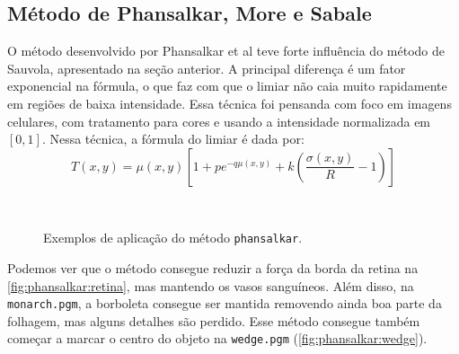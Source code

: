 \subsection{Método de Phansalkar, More e Sabale}

O método desenvolvido por Phansalkar et al teve forte influência do método de Sauvola, apresentado na seção anterior. A principal diferença é um fator exponencial na fórmula, o que faz com que o limiar não caia muito rapidamente em regiões de baixa intensidade. Essa técnica foi pensanda com foco em imagens celulares, com tratamento para cores e usando a intensidade normalizada em $[0, 1]$. Nessa técnica, a fórmula do limiar é dada por:
\[
    T(x, y) = \mu(x, y) \left[1 + p e^{-q \mu(x, y)} + k \left(\frac{\sigma(x, y)}{R} - 1\right)\right]
\]

\begin{figure}[H]
    \centering
    \\[8pt]

    \caption{Exemplos de aplicação do método \texttt{phansalkar}.}
    \label{fig:phansalkar}
\end{figure}

Podemos ver que o método consegue reduzir a força da borda da retina na \cref{fig:phansalkar:retina}, mas mantendo os vasos sanguíneos. Além disso, na \texttt{monarch.pgm}, a borboleta consegue ser mantida removendo ainda boa parte da folhagem, mas alguns detalhes são perdido. Esse método consegue também começar a marcar o centro do objeto na \texttt{wedge.pgm} (\cref{fig:phansalkar:wedge}).